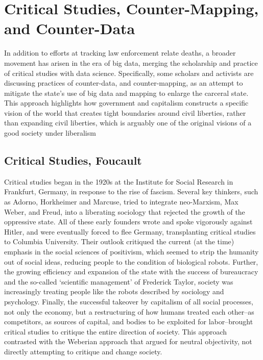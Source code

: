 \documentclass[sigconf]{acmart}
\begin{document}
\section{Critical Studies, Counter-Mapping, and Counter-Data}
In addition to efforts at tracking law enforcement relate deaths, a broader movement has arisen in the era of big data, merging the scholarship and practice of critical studies with data science.  Specifically, some scholars and activists are discussing practices of counter-data, and counter-mapping, as an attempt to mitigate the state's use of big data and mapping to enlarge the carceral state. \cite{jefferson17,currie16,dalton17,ccc12}  This approach highlights how government and capitalism constructs a specific vision of the world that creates tight boundaries around civil liberties, rather than expanding civil liberties, which is arguably one of the original visions of a good society under liberalism

\subsection{Critical Studies, Foucault}
Critical studies began in the 1920s at the Institute for Social Research in Frankfurt, Germany, in response to the rise of fascism. \cite{ritzer18,seidman16}  Several key thinkers, such as Adorno, Horkheimer and Marcuse, tried to integrate neo-Marxism, Max Weber, and Freud, into a liberating sociology that rejected the growth of the oppressive state.  All of these early founders wrote and spoke vigorously against Hitler, and were eventually forced to flee Germany, transplanting critical studies to Columbia University. \cite{ritzer18}  Their outlook critiqued the current (at the time) emphasis in the social sciences of positivism, which seemed to strip the humanity out of social ideas, reducing people to the condition of biological robots.  Further, the growing efficiency and expansion of the state with the success of bureaucracy and the so-called `scientific management' of Frederick Taylor, society was increasingly treating people like the robots described by sociology and psychology.  Finally, the successful takeover by capitalism of all social processes, not only the economy, but a restructuring of how humans treated each other--as competitors, as sources of capital, and bodies to be exploited for labor--brought critical studies to critique the entire direction of society.  This approach contrasted with the Weberian approach that argued for neutral objectivity, not directly attempting to critique and change society. \cite{ritzer18,seidman16}
\end{document}

